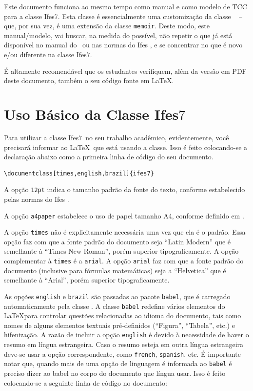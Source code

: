 \documentclass[times,english,brazil,oneside]{ifes7}
\newcommand{\ifestex}{\textsf{Ifes$7$}}
\begin{document}
Este documento funciona ao mesmo tempo como manual e como modelo de
TCC para a classe \ifestex. Esta classe é essencialmente uma
customização da classe \abnTeX\ \cite{abntex2classe} -- que, por sua
vez, é uma extensão da classe \texttt{memoir}. Deste modo, este
manual/modelo, vai buscar, na medida do possível, não repetir o que já
está disponível no manual do \abnTeX\ ou nas normas do Ifes
\cite{Ifes2014}, e se concentrar no que é novo e/ou diferente na
classe \ifestex.

É altamente recomendável que os estudantes verifiquem, além da versão
em PDF deste documento, também o seu código fonte em \LaTeX.

\section{Uso Básico da Classe \ifestex}
\label{sec:uso-basico}

Para utilizar a classe \ifestex\ no seu trabalho acadêmico,
evidentemente, você precisará informar ao \LaTeX\ que está usando a
classe. Isso é feito colocando-se a declaração abaixo como a primeira
linha de código do seu documento.\vspace{\baselineskip}

\begin{lstlisting}[language={[LaTeX]TeX}]
  \documentclass[times,english,brazil]{ifes7}  
\end{lstlisting}

A opção \texttt{12pt} indica o tamanho padrão da fonte do texto,
conforme estabelecido pelas normas do Ifes \cite[pp.~20]{Ifes2014}.

A opção \texttt{a4paper} estabelece o uso de papel tamanho A4,
conforme definido em \cite[pp.~19]{Ifes2014}.

A opção \texttt{times} não é explicitamente necessária uma vez que ela
é o padrão. Essa opção faz com que a fonte padrão do documento seja
“Latin Modern” que é semelhante à “Times New Roman”, porém superior
tipograficamente. A opção complementar à \texttt{times} é a
\texttt{arial}. A opção \texttt{arial} faz com que a fonte padrão do
documento (inclusive para fórmulas matemáticas) seja a “Helvetica” que
é semelhante à “Arial”, porém superior tipograficamente.

As opções \texttt{english} e \texttt{brazil} são passadas ao pacote
\texttt{babel}, que é carregado automaticamente pela classe \abnTeX.
A classe \texttt{babel} redefine vários elementos do \LaTeX para
controlar questões relacionadas ao idioma do documento, tais como
nomes de alguns elementos textuais pré-definidos (``Figura'',
``Tabela'', etc.) e hifenização. A razão de incluir a opção
\texttt{english} é devido à necessidade de haver o resumo em língua
estrangeira. Caso o resumo esteja em outra língua estrangeira deve-se
usar a opção correspondente, como \texttt{french}, \texttt{spanish},
etc. É importante notar que, quando mais de uma opção de linguagem é
informada ao \texttt{babel} é preciso dizer ao babel no corpo do
documento que língua usar. Isso é feito colocando-se a seguinte linha
de código no documento:\vspace{\baselineskip}
\end{document}
